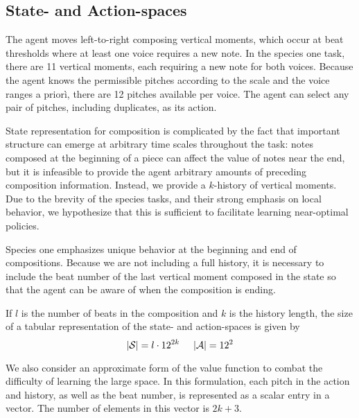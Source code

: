 \documentclass{article}
\begin{document}
    \subsection{State- and Action-spaces}
    
    The agent moves left-to-right composing vertical moments, which occur at beat thresholds where at least one voice requires a new note. In the species one task, there are 11 vertical moments, each requiring a new note for both voices. Because the agent knows the permissible pitches according to the scale and the voice ranges a prior\`i, there are 12 pitches available per voice. The agent can select any pair of pitches, including duplicates, as its action.
   
    State representation for composition is complicated by the fact that important structure can emerge at arbitrary time scales throughout the task: notes composed at the beginning of a piece can affect the value of notes near the end, but it is infeasible to provide the agent arbitrary amounts of preceding composition information. Instead, we provide a $k$-history of vertical moments. Due to the brevity of the species tasks, and their strong emphasis on local behavior, we hypothesize that this is sufficient to facilitate learning near-optimal policies.
    
    Species one emphasizes unique behavior at the beginning and end of compositions. Because we are not including a full history, it is necessary to include the beat number of the last vertical moment composed in the state so that the agent can be aware of when the composition is ending.
    
    If $l$ is the number of beats in the composition and $k$ is the history length, the size of a tabular representation of the state- and action-spaces is given by
    \begin{equation}
        |\mathcal{S}| = l \cdot 12^{2k} \hspace{0.5cm} |\mathcal{A}| = 12^2
    \end{equation}
  
    We also consider an approximate form of the value function to combat the difficulty of learning the large space. In this formulation, each pitch in the action and history, as well as the beat number, is represented as a scalar entry in a vector. The number of elements in this vector is $2k + 3$.
    
    
\end{document}
